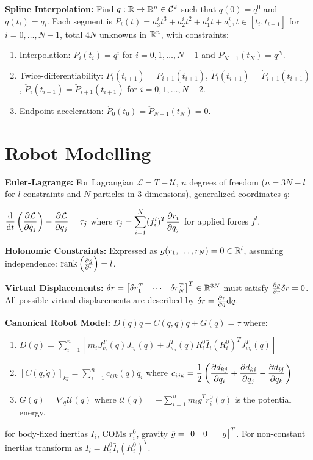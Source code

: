 \documentclass[twocolumn, 8pt]{extarticle}
\begin{document}
\textbf{Spline Interpolation:} Find $q: \mathbb{R} \mapsto \mathbb{R}^n \in \mathcal C^2$ such that $q(0) = q^0$ and $q(t_i) = q_i$.
Each segment is \(P_i(t) = a_3^it^3 + a_2^it^2 + a_1^it + a_0^i, t \in [t_i, t_{i + 1}]\) for \(i = 0, \dots, N - 1\),
total \(4N\) unknowns in \(\mathbb{R}^n\), with constraints:
\begin{enumerate}
    \item Interpolation: \(P_i(t_i) = q^i\) for \(i = 0, 1, \dots, N - 1\) and \(P_{N - 1}(t_N) = q^N\).
    \item Twice-differentiability: \(P_i(t_{i + 1}) = P_{i + 1}(t_{i + 1})\), \(\dot P_i(t_{i + 1}) = \dot P_{i + 1}(t_{i + 1})\), \(\ddot P_i(t_{i + 1}) = \ddot P_{i + 1}(t_{i + 1})\) for \(i = 0, 1, \dots, N - 2\).
    \item Endpoint acceleration: \(\ddot P_0(t_0) = \ddot P_{N - 1}(t_N) = 0\).
\end{enumerate}

\section{Robot Modelling}

\textbf{Euler-Lagrange:} For Lagrangian \(\mathcal L = T - \mathcal U\), \(n\) degrees of freedom ($n = 3N - l$ for $l$
constraints and $N$ particles in 3 dimensions), generalized coordinates \(q\):

\(\displaystyle\frac{\mathrm{d}}{\mathrm{d}t}\left(\frac{\partial\mathcal L}{\partial\dot q_j}\right) - \frac{\partial\mathcal L}{\partial q_j} = \tau _j\)
where \(\displaystyle \tau _j = \sum _{i = 1}^N (f_i^l)^T\frac{\partial r_i}{\partial q_j}\)
for applied forces $f^l$.

\textbf{Holonomic Constraints:} Expressed as \(g(r_1, \dots, r_N) = 0 \in \mathbb{R}^l\), assuming independence:
\(\operatorname{rank}\left(\frac{\partial g}{\partial r}\right) = l\).

\textbf{Virtual Displacements:}
\(\delta r = \rvec{\delta r_1^T}{\cdots}{\delta r_N^T}^T \in \reals^{3N}\)
must satisfy \(\frac{\partial g}{\partial r}\delta r = 0\).
All possible virtual displacements are described by \(\delta r = \frac{\partial r}{\partial q}\mathrm{d}q\).

\textbf{Canonical Robot Model:} \(D(q)\ddot q + C(q, \dot q)\dot q + G(q) = \tau\) where:
\begin{enumerate}
	\item $D(q) = \sum _{i = 1}^n \left[m_iJ_{v_i}^T(q)J_{v_i}(q) + J_{w_i}^T(q)R_i^0\bar I_i(R_i^0)^TJ_{w_i}^T(q)\right]$
	\item $\left[C(q, \dot q)\right]_{kj} = \sum _{i = 1}^n c_{ijk}(q)\dot q_i$ where $\displaystyle c_{ijk} = \frac{1}{2}\left(\frac{\partial d_{kj}}{\partial q_i} + \frac{\partial d_{ki}}{\partial q_j} - \frac{\partial d_{ij}}{\partial q_k}\right)$
	\item $G(q) = \nabla _q\mathcal U(q)$ where $\mathcal U(q) = -\sum _{i = 1}^n m_i\bar g^Tr_i^0(q)$ is the potential energy.
\end{enumerate}
for body-fixed inertias $\bar I_i$, COMs $r_i^0$, gravity $\bar g = \rvec{0}{0}{-g}^T$.
For non-constant inertias transform as \(I_i = R_i^0\bar I_i(R_i^0)^T\).
\end{document}

